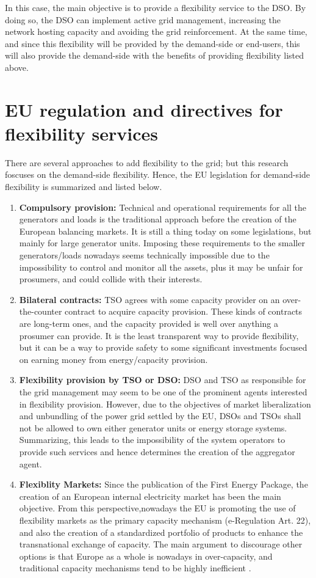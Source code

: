 In this case, the main objective is to provide a flexibility service to the DSO. By doing so, the DSO can implement active grid management, increasing the network hosting capacity and avoiding the grid reinforcement. At the same time, and since this flexibility will be provided by the demand-side or end-users, this will also provide the demand-side with the benefits of providing flexibility listed above. 

\section{EU regulation and directives for flexibility services}
There are several approaches to add flexibility to the grid; but this research foscuses on the demand-side flexibility. Hence, the EU legislation for demand-side flexibility is summarized and listed below. 

\begin{enumerate}
\item \textbf{Compulsory provision:} Technical and operational requirements for all the generators and loads is the traditional approach before the creation of the European balancing markets. It is still a thing today on some legislations, but mainly for large generator units. Imposing these requirements to the smaller generators/loads nowadays seems technically impossible due to the impossibility to control and monitor all the assets, plus it may be unfair for prosumers, and could collide with their interests.
\item \textbf{Bilateral contracts:} TSO agrees with some capacity provider on an over-the-counter contract to acquire capacity provision. These kinds of contracts are long-term ones, and the capacity provided is well over anything a prosumer can provide. It is the least transparent way to provide flexibility, but it can be a way to provide safety to some significant investments focused on earning money from energy/capacity provision. 
\item  \textbf{Flexibility provision by TSO or DSO:} DSO and TSO as responsible for the grid management may seem to be one of the prominent agents interested in flexibility provision. However, due to the objectives of market liberalization and unbundling of the power grid settled by the EU, DSOs and TSOs shall not be allowed to own either generator units or energy storage systems. Summarizing, this leads to the impossibility of the system operators to provide such services and hence determines the creation of the aggregator agent.  
\item  \textbf{Flexiblity Markets:} Since the publication of the First Energy Package, the creation of an European internal electricity market has been the main objective. From this perspective,nowadays the EU is promoting the use of flexibility markets as the primary capacity mechanism \cite{Directive2019943} (e-Regulation Art. 22), and also the creation of a standardized portfolio of products to enhance the transnational exchange of capacity. The main argument to discourage other options is that Europe as a whole is nowadays in over-capacity, and traditional capacity mechanisms tend to be highly inefficient \cite{Hancher2017, validzic2017clean}.
\end{enumerate}

